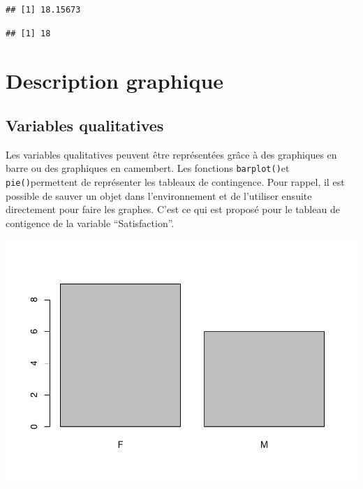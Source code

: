 \documentclass[
]{book}
\newenvironment{Shaded}{\begin{snugshade}}{\end{snugshade}}
\newcommand{\FunctionTok}[1]{\textcolor[rgb]{0.13,0.29,0.53}{\textbf{#1}}}
\newcommand{\NormalTok}[1]{#1}
\newcommand{\SpecialCharTok}[1]{\textcolor[rgb]{0.81,0.36,0.00}{\textbf{#1}}}
\begin{document}
\begin{verbatim}
## [1] 18.15673
\end{verbatim}

\begin{Shaded}
\end{Shaded}

\begin{verbatim}
## [1] 18
\end{verbatim}

\section{Description graphique}\label{description-graphique}

\subsection{Variables qualitatives}\label{variables-qualitatives-1}

Les variables qualitatives peuvent être représentées grâce à des graphiques en barre ou des graphiques en camembert. Les fonctions \texttt{barplot()}et \texttt{pie()}permettent de représenter les tableaux de contingence. Pour rappel, il est possible de sauver un objet dans l'environnement et de l'utiliser ensuite directement pour faire les graphes. C'est ce qui est proposé pour le tableau de contigence de la variable ``Satisfaction''.

\begin{Shaded}
\end{Shaded}

\includegraphics{_main_files/figure-latex/unnamed-chunk-51-1.pdf}
\end{document}
